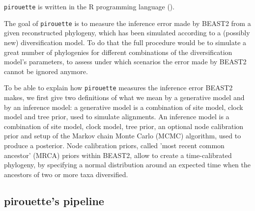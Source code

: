\documentclass{article}
\begin{document}
\verb;pirouette; is written in the R programming language (\cite{R}).

The goal of \verb;pirouette; is to measure the inference error made by BEAST2 from a given reconstructed phylogeny, which has been simulated according to a (possibly new) diversification model.
To do that the full procedure would be to simulate a great number of phylogenies for different combinations of the diversification model's parameters, to assess under which scenarios the error made by BEAST2 cannot be ignored anymore. 

To be able to explain how \verb;pirouette; measures the inference error
BEAST2 makes, we first give two definitions of what
we mean by a generative model and by an inference model: 
a generative model is a combination of site model, clock model and tree prior,
used to simulate alignments. An inference model is a combination of 
site model, clock model, tree prior, an optional node calibration prior
and setup of the Markov chain Monte Carlo (MCMC) algorithm, 
used to produce a posterior. Node calibration priors, called 'most
recent common ancestor' (MRCA) priors within BEAST2, allow to create a time-calibrated phylogeny, by specifying a normal distribution around an expected time when the ancestors of two or more taxa diversified. 

\subsection{pirouette's pipeline}
\end{document}
